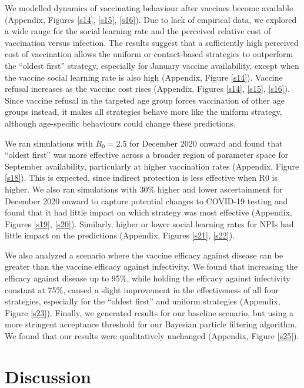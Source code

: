We modelled dynamics of vaccinating behaviour after vaccines become available (Appendix, Figures \ref{s14}, \ref{s15}, \ref{s16}).  Due to lack of empirical data, we explored a wide range for the social learning rate and the perceived relative cost of vaccination versus infection. The results suggest that a sufficiently high perceived cost of vaccination allows the uniform or contact-based strategies to outperform the “oldest first” strategy, especially for January vaccine availability, except when the vaccine social learning rate is also high (Appendix, Figure \ref{s14}). Vaccine refusal increases as the vaccine cost rises (Appendix, Figures \ref{s14}, \ref{s15}, \ref{s16}). Since vaccine refusal in the targeted age group forces vaccination of other age groups instead, it makes all strategies behave more like the uniform strategy, although age-specific behaviours could change these predictions. 

We ran simulations with $R_0=2.5$ for December 2020 onward and found that “oldest first” was more effective across a broader region of parameter space for September availability, particularly at higher vaccination rates (Appendix, Figure \ref{s18}). This is expected, since indirect protection is less effective when R0 is higher. We also ran simulations with 30\% higher and lower ascertainment for December 2020 onward to capture potential changes to COVID-19 testing and found that it had little impact on which strategy was most effective (Appendix, Figures \ref{s19}, \ref{s20}).  Similarly, higher or lower social learning rates for NPIs had little impact on the predictions (Appendix, Figures \ref{s21}, \ref{s22}). 

We also analyzed a scenario where the vaccine efficacy against disease can be greater than the vaccine efficacy against infectivity. We found that increasing the efficacy against disease up to 95\%, while holding the efficacy against infectivity constant at 75\%, caused a slight improvement in the effectiveness of all four strategies, especially for the “oldest first” and uniform strategies (Appendix, Figure \ref{s23}).  Finally, we generated results for our baseline scenario, but using a more stringent acceptance threshold for our Bayesian particle filtering algorithm. We found that our results were qualitatively unchanged (Appendix, Figure  \ref{s25}).  


\section{Discussion}

